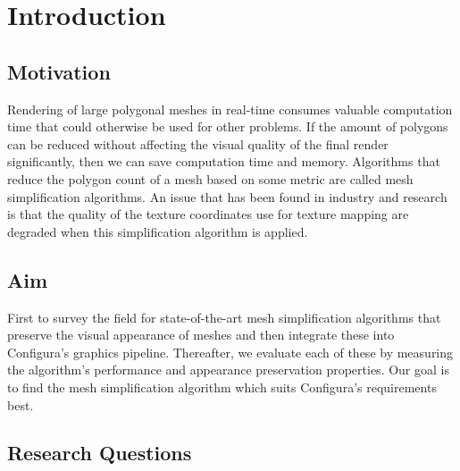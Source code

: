 

\chapter{Introduction}
\label{cha:introduction}

\section{Motivation}
\label{sec:motivation}

Rendering of large polygonal meshes in real-time consumes valuable computation time that
could otherwise be used for other problems. If the amount of polygons can be reduced without
affecting the visual quality of the final render significantly, then we can save computation time
and memory. Algorithms that reduce the polygon count of a mesh based on some metric are
called mesh simplification algorithms. An issue that has been found in industry and research is
that the quality of the texture coordinates use for texture mapping are degraded when this
simplification algorithm is applied.

\section{Aim}
\label{sec:aim}

First to survey the field for state-of-the-art mesh simplification algorithms that preserve the visual appearance of meshes and then integrate these into Configura's graphics pipeline. Thereafter, we evaluate each of these by measuring the algorithm's performance and appearance preservation properties. Our goal is to find the mesh simplification algorithm which suits Configura's requirements best.

\section{Research Questions}
\label{sec:research-questions}

